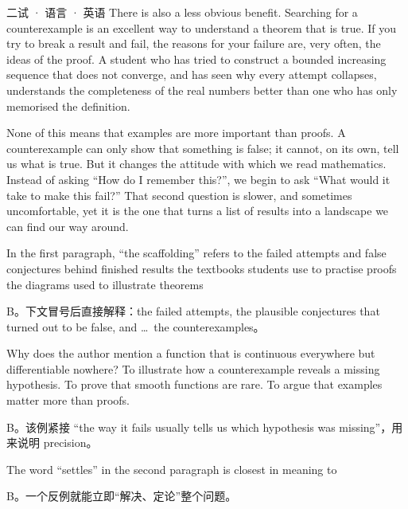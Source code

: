 \documentclass[cjk=noto, seal=first]{mojing-exam}
\begin{document}
\begin{paper}[time={建议 2 小时（训练设置）}, full=100]{二试 · 语言 · 英语}
There is also a less obvious benefit. Searching for a counterexample is an excellent way to understand a theorem that is true.
If you try to break a result and fail, the reasons for your failure are, very often, the ideas of the proof. A student who has tried
to construct a bounded increasing sequence that does not converge, and has seen why every attempt collapses, understands the
completeness of the real numbers better than one who has only memorised the definition.

None of this means that examples are more important than proofs. A counterexample can only show that something is false; it cannot,
on its own, tell us what is true. But it changes the attitude with which we read mathematics. Instead of asking ``How do I remember
this?'', we begin to ask ``What would it take to make this fail?'' That second question is slower, and sometimes uncomfortable, yet it
is the one that turns a list of results into a landscape we can find our way around.

\begin{questions}
\question[4] In the first paragraph, ``the scaffolding'' refers to \paren[B]
        {the failed attempts and false conjectures behind finished results}
        {the textbooks students use to practise proofs}
        {the diagrams used to illustrate theorems}
\begin{solution}
B。下文冒号后直接解释：the failed attempts, the plausible conjectures that turned out to be false, and \dots\ the counterexamples。
\end{solution}

\question[4] Why does the author mention a function that is continuous everywhere but differentiable nowhere? \paren[B]
        {To illustrate how a counterexample reveals a missing hypothesis.}
        {To prove that smooth functions are rare.}
        {To argue that examples matter more than proofs.}
\begin{solution}
B。该例紧接 ``the way it fails usually tells us which hypothesis was missing''，用来说明 precision。
\end{solution}

\question[4] The word ``settles'' in the second paragraph is closest in meaning to \paren[B]
\begin{solution}
B。一个反例就能立即“解决、定论”整个问题。
\end{solution}


\end{questions}
\end{paper}
\end{document}
